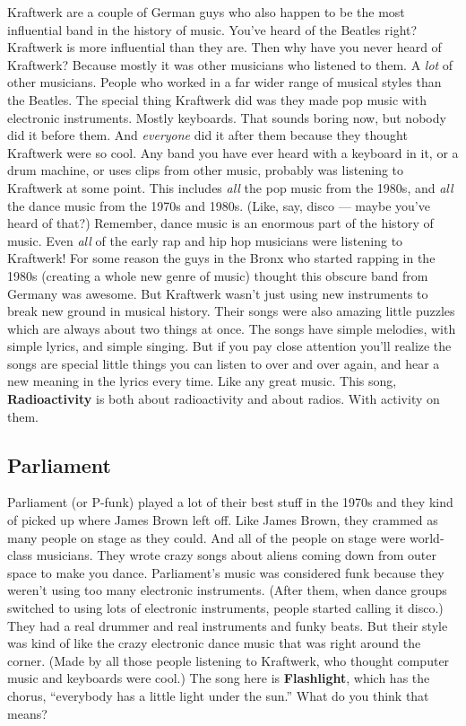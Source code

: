 \documentclass[letterpaper,]{article}
\begin{document}
Kraftwerk are a couple of German guys who also happen to be the most
influential band in the history of music. You've heard of the Beatles
right? Kraftwerk is more influential than they are. Then why have you
never heard of Kraftwerk? Because mostly it was other musicians who
listened to them. A \emph{lot} of other musicians. People who worked in
a far wider range of musical styles than the Beatles. The special thing
Kraftwerk did was they made pop music with electronic instruments.
Mostly keyboards. That sounds boring now, but nobody did it before them.
And \emph{everyone} did it after them because they thought Kraftwerk
were so cool. Any band you have ever heard with a keyboard in it, or a
drum machine, or uses clips from other music, probably was listening to
Kraftwerk at some point. This includes \emph{all} the pop music from the
1980s, and \emph{all} the dance music from the 1970s and 1980s. (Like,
say, disco --- maybe you've heard of that?) Remember, dance music is an
enormous part of the history of music. Even \emph{all} of the early rap
and hip hop musicians were listening to Kraftwerk! For some reason the
guys in the Bronx who started rapping in the 1980s (creating a whole new
genre of music) thought this obscure band from Germany was awesome. But
Kraftwerk wasn't just using new instruments to break new ground in
musical history. Their songs were also amazing little puzzles which are
always about two things at once. The songs have simple melodies, with
simple lyrics, and simple singing. But if you pay close attention you'll
realize the songs are special little things you can listen to over and
over again, and hear a new meaning in the lyrics every time. Like any
great music. This song, \textbf{Radioactivity} is both about
radioactivity and about radios. With activity on them.

\hypertarget{parliament}{%
\subsection{Parliament}\label{parliament}}

Parliament (or P-funk) played a lot of their best stuff in the 1970s and
they kind of picked up where James Brown left off. Like James Brown,
they crammed as many people on stage as they could. And all of the
people on stage were world-class musicians. They wrote crazy songs about
aliens coming down from outer space to make you dance. Parliament's
music was considered funk because they weren't using too many electronic
instruments. (After them, when dance groups switched to using lots of
electronic instruments, people started calling it disco.) They had a
real drummer and real instruments and funky beats. But their style was
kind of like the crazy electronic dance music that was right around the
corner. (Made by all those people listening to Kraftwerk, who thought
computer music and keyboards were cool.) The song here is
\textbf{Flashlight}, which has the chorus, ``everybody has a little
light under the sun.'' What do you think that means?
\end{document}
